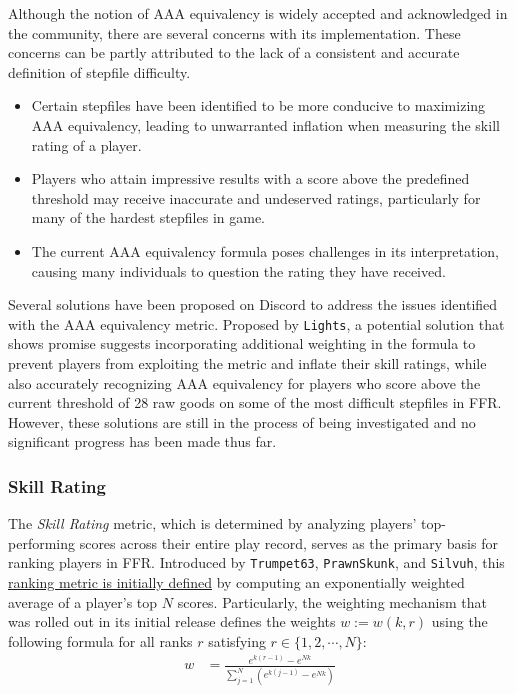 

Although the notion of AAA equivalency is widely accepted and acknowledged in the community, there are several concerns with its implementation. These concerns can be partly attributed to the lack of a consistent and accurate definition of stepfile difficulty.

\begin{itemize}
	\item Certain stepfiles have been identified to be more conducive to maximizing AAA equivalency, leading to unwarranted inflation when measuring the skill rating of a player.
	\item Players who attain impressive results with a score above the predefined threshold may receive inaccurate and undeserved ratings, particularly for many of the hardest stepfiles in game.
	\item The current AAA equivalency formula poses challenges in its interpretation, causing many individuals to question the rating they have received.
\end{itemize}

Several solutions have been proposed on Discord to address the issues identified with the AAA equivalency metric. Proposed by \texttt{Lights}, a potential solution that shows promise suggests incorporating additional weighting in the formula to prevent players from exploiting the metric and inflate their skill ratings, while also accurately recognizing AAA equivalency for players who score above the current threshold of 28 raw goods on some of the most difficult stepfiles in FFR. However, these solutions are still in the process of being investigated and no significant progress has been made thus far.

\subsubsection{Skill Rating}

The \textit{Skill Rating} metric, which is determined by analyzing players' top-performing scores across their entire play record, serves as the primary basis for ranking players in FFR. Introduced by \texttt{Trumpet63}, \texttt{PrawnSkunk}, and \texttt{Silvuh}, this \href{https://www.flashflashrevolution.com/ffr/new-skill-based-ranking-system-leaderboards/}{ranking metric is initially defined} by computing an exponentially weighted average of a player's top $N$ scores. Particularly, the weighting mechanism that was rolled out in its initial release defines the weights $w := w(k, r)$ using the following formula for all ranks $r$ satisfying $r \in \{1, 2, \cdots, N\}$:
\begin{align*}
	w & = \frac{e^{k(r-1)} - e^{Nk}}{\displaystyle \sum_{j = 1}^{N} \left(e^{k(j-1)} - e^{Nk}\right)}
\end{align*}


